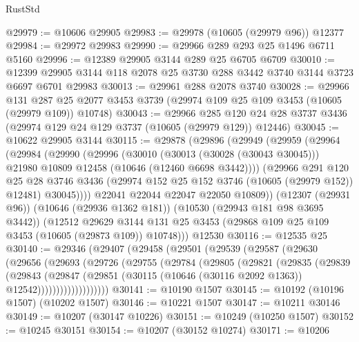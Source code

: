 \begin{lexlean}{RustStd}
\begin{coremodule}
@29979 := @10606 @29905
@29983 := @29978 (@10605 (@29979 @96)) @12377
@29984 := @29972 @29983
@29990 := @29966 @289 @293 @25 @1496 @6711 @5160
@29996 := @12389 @29905 @3144 @289 @25 @6705 @6709
@30010 := @12399 @29905 @3144 @118 @2078 @25 @3730 @288 @3442 @3740 @3144 @3723 @6697 @6701 @29983
@30013 := @29961 @288 @2078 @3740
@30028 := @29966
    @131
    @287
    @25
    @2077
    @3453
    @3739
    (@29974 @109 @25 @109 @3453 (@10605 (@29979 @109)) @10748)
@30043 := @29966
    @285
    @120
    @24
    @28
    @3737
    @3436
    (@29974 @129 @24 @129 @3737 (@10605 (@29979 @129)) @12446)
@30045 := @10622 @29905 @3144
@30115 := @29878
    (@29896
      (@29949
        (@29959
          (@29964
            (@29984
              (@29990
                (@29996
                  (@30010
                    (@30013 (@30028 (@30043 @30045)))
                    @21980
                    @10809
                    @12458
                    (@10646 (@12460 @6698 @3442))))
                (@29966
                  @291
                  @120
                  @25
                  @28
                  @3746
                  @3436
                  (@29974 @152 @25 @152 @3746 (@10605 (@29979 @152)) @12481)
                  @30045))))
          @22041
          @22044
          @22047
          @22050
          @10809))
      (@12307 (@29931 @96))
      (@10646 (@29936 @1362 @181))
      (@10530 (@29943 @181 @98 @3695 @3442))
      (@12512
        @29629
        @3144
        @131
        @25
        @3453
        (@29868 @109 @25 @109 @3453 (@10605 (@29873 @109)) @10748)))
    @12530
@30116 := @12535 @25
@30140 := @29346
    (@29407
      (@29458
        (@29501
          (@29539
            (@29587
              (@29630
                (@29656
                  (@29693
                    (@29726
                      (@29755
                        (@29784
                          (@29805
                            (@29821
                              (@29835
                                (@29839
                                  (@29843
                                    (@29847
                                      (@29851
                                        (@30115
                                          (@10646 (@30116 @2092 @1363))
                                          @12542)))))))))))))))))))
@30141 := @10190 @1507
@30145 := @10192 (@10196 @1507) (@10202 @1507)
@30146 := @10221 @1507
@30147 := @10211 @30146
@30149 := @10207 (@30147 @10226)
@30151 := @10249 (@10250 @1507)
@30152 := @10245 @30151
@30154 := @10207 (@30152 @10274)
@30171 := @10206

\end{coremodule}
\end{lexlean}
